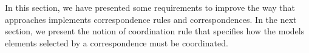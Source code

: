 {	%



	

In this section, we have presented some requirements to improve the way that approaches implements correspondence rules and correspondences. %
In the next section, we present the notion of coordination rule that specifies how the models elements selected by a correspondence must be coordinated.     
	
	
					


}
